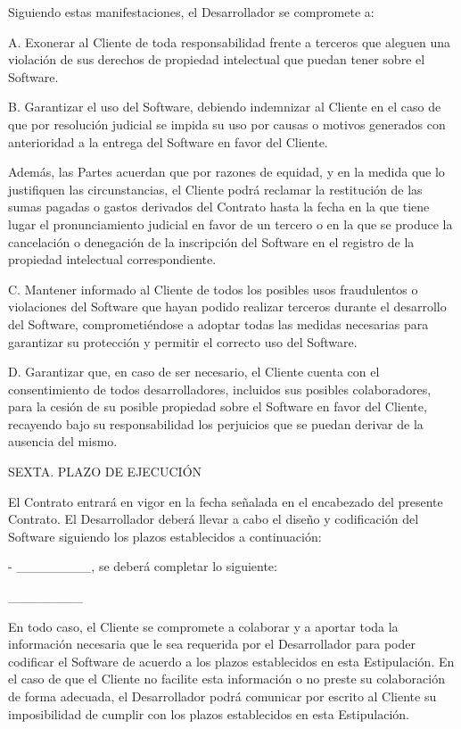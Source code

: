 \documentclass[a4paper,11pt]{report}
\begin{document}
	Siguiendo estas manifestaciones, el Desarrollador se compromete a:
	
	A. Exonerar al Cliente de toda responsabilidad frente a terceros que
	aleguen una violación de sus derechos de propiedad intelectual que
	puedan tener sobre el Software.
	
	B. Garantizar el uso del Software, debiendo indemnizar al Cliente en el
	caso de que por resolución judicial se impida su uso por causas o
	motivos generados con anterioridad a la entrega del Software en favor
	del Cliente.
	
	Además, las Partes acuerdan que por razones de equidad, y en la medida
	que lo justifiquen las circunstancias, el Cliente podrá reclamar la
	restitución de las sumas pagadas o gastos derivados del Contrato hasta
	la fecha en la que tiene lugar el pronunciamiento judicial en favor de
	un tercero o en la que se produce la cancelación o denegación de la
	inscripción del Software en el registro de la propiedad intelectual
	correspondiente.
	
	C. Mantener informado al Cliente de todos los posibles usos fraudulentos
	o violaciones del Software que hayan podido realizar terceros durante el
	desarrollo del Software, comprometiéndose a adoptar todas las medidas
	necesarias para garantizar su protección y permitir el correcto uso del
	Software.
	
	D. Garantizar que, en caso de ser necesario, el Cliente cuenta con el
	consentimiento de todos desarrolladores, incluidos sus posibles
	colaboradores, para la cesión de su posible propiedad sobre el Software
	en favor del Cliente, recayendo bajo su responsabilidad los perjuicios
	que se puedan derivar de la ausencia del mismo.
	
	SEXTA. PLAZO DE EJECUCIÓN
	
	El Contrato entrará en vigor en la fecha señalada en el encabezado del
	presente Contrato. El Desarrollador deberá llevar a cabo el diseño y
	codificación del Software siguiendo los plazos establecidos a
	continuación:
	
	- \_\_\_\_\_\_\_\_, se deberá completar lo siguiente:
	
	\_\_\_\_\_\_\_\_
	
	En todo caso, el Cliente se compromete a colaborar y a aportar toda la
	información necesaria que le sea requerida por el Desarrollador para
	poder codificar el Software de acuerdo a los plazos establecidos en esta
	Estipulación. En el caso de que el Cliente no facilite esta información
	o no preste su colaboración de forma adecuada, el Desarrollador podrá
	comunicar por escrito al Cliente su imposibilidad de cumplir con los
	plazos establecidos en esta Estipulación.
	
\end{document}
